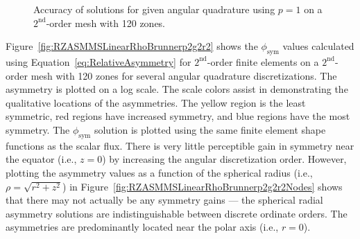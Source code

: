 \documentclass[12pt]{article}
\begin{document}
\begin{figure}[!htb]
\centering
{}
\caption{Accuracy of solutions for given angular quadrature using $p=1$ on a $2^\text{nd}$-order mesh with 120 zones.}
\label{fig:RZASMMSLinearRhoBrunnerp1g2r2Accuracy}
\end{figure}

\FloatBarrier

Figure~\ref{fig:RZASMMSLinearRhoBrunnerp2g2r2} shows the $\phi_\text{sym}$ values calculated using Equation~\ref{eq:RelativeAsymmetry} for $2^\text{nd}$-order finite elements on a $2^\text{nd}$-order mesh with 120 zones for several angular quadrature discretizations. The asymmetry is plotted on a log scale. The scale colors assist in demonstrating the qualitative locations of the asymmetries. The yellow region is the least symmetric, red regions have increased symmetry, and blue regions have the most symmetry. The $\phi_\text{sym}$ solution is plotted using the same finite element shape functions as the scalar flux. There is very little perceptible gain in symmetry near the equator (i.e., $z=0$) by increasing the angular discretization order. However, plotting the asymmetry values as a function of the spherical radius (i.e., $\rho=\sqrt{r^2+z^2}$) in Figure~\ref{fig:RZASMMSLinearRhoBrunnerp2g2r2Nodes} shows that there may not actually be any symmetry gains --- the spherical radial asymmetry solutions are indistinguishable between discrete ordinate orders. The asymmetries are predominantly located near the polar axis (i.e., $r=0$).
\end{document}
